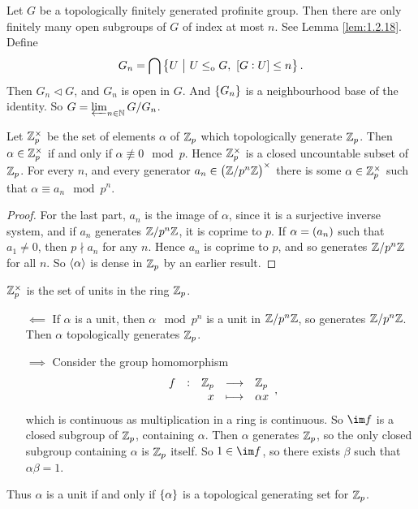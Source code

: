\begin{example}
\label{eg:2.5.9}
Let $ G $ be a topologically finitely generated profinite group. Then there are only finitely many open subgroups of $ G $ of index at most $ n $. See Lemma \ref{lem:1.2.18}. Define
$$ G_n = \bigcap \cbr{U \st U \le_\o G, \ \sbr{G : U} \le n}. $$
Then $ G_n \triangleleft G $, and $ G_n $ is open in $ G $. And $ \cbr{G_n} $ is a neighbourhood base of the identity. So $ G = \varprojlim_{n \in \mathbb{N}} G / G_n $.
\end{example}

\begin{proposition}
\label{prop:2.5.10}
Let $ \mathbb{Z}_p^\times $ be the set of elements $ \alpha $ of $ \mathbb{Z}_p $ which topologically generate $ \mathbb{Z}_p $. Then $ \alpha \in \mathbb{Z}_p^\times $ if and only if $ \alpha \not\equiv 0 \mod p $. Hence $ \mathbb{Z}_p^\times $ is a closed uncountable subset of $ \mathbb{Z}_p $. For every $ n $, and every generator $ a_n \in \br{\ZZ / p^n\ZZ}^\times $ there is some $ \alpha \in \mathbb{Z}_p^\times $ such that $ \alpha \equiv a_n \mod p^n $.
\end{proposition}

\begin{proof}
For the last part, $ a_n $ is the image of $ \alpha $, since it is a surjective inverse system, and if $ a_n $ generates $ \mathbb{Z} / p^n\mathbb{Z} $, it is coprime to $ p $. If $ \alpha = \br{a_n} $ such that $ a_1 \ne 0 $, then $ p \nmid a_n $ for any $ n $. Hence $ a_n $ is coprime to $ p $, and so generates $ \mathbb{Z} / p^n\mathbb{Z} $ for all $ n $. So $ \left\langle \alpha \right\rangle $ is dense in $ \mathbb{Z}_p $ by an earlier result.
\end{proof}


\begin{remark}
$ \mathbb{Z}_p^\times $ is the set of units in the ring $ \mathbb{Z}_p $.
\begin{itemize}[leftmargin=0.5in]
\item[$ \impliedby $] If $ \alpha $ is a unit, then $ \alpha \mod p^n $ is a unit in $ \mathbb{Z} / p^n\mathbb{Z} $, so generates $ \mathbb{Z} / p^n\mathbb{Z} $. Then $ \alpha $ topologically generates $ \mathbb{Z}_p $.
\item[$ \implies $] Consider the group homomorphism
$$ \function[f]{\ZZ_p}{\ZZ_p}{x}{\alpha x}, $$
which is continuous as multiplication in a ring is continuous. So $ \im f $ is a closed subgroup of $ \mathbb{Z}_p $, containing $ \alpha $. Then $ \alpha $ generates $ \mathbb{Z}_p $, so the only closed subgroup containing $ \alpha $ is $ \mathbb{Z}_p $ itself. So $ 1 \in \im f $, so there exists $ \beta $ such that $ \alpha\beta = 1 $.
\end{itemize}
Thus $ \alpha $ is a unit if and only if $ \cbr{\alpha} $ is a topological generating set for $ \mathbb{Z}_p $.
\end{remark}

